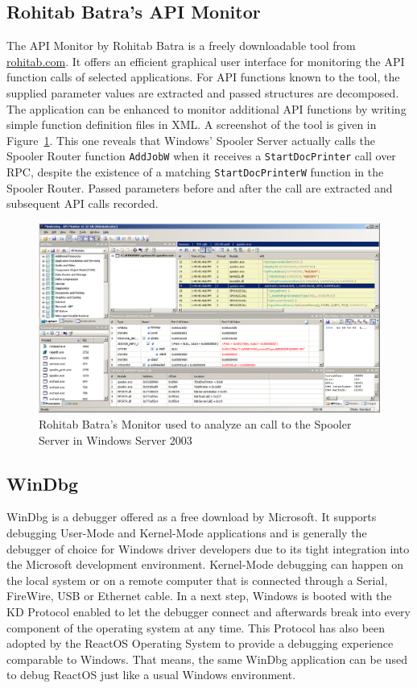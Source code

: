 \subsection{Rohitab Batra's API Monitor}
The \gls{API} Monitor by Rohitab Batra is a freely downloadable tool from \href{http://rohitab.com}{rohitab.com}.
It offers an efficient graphical user interface for monitoring the \gls{API} function calls of selected applications.
For \gls{API} functions known to the tool, the supplied parameter values are extracted and passed structures are decomposed.
The application can be enhanced to monitor additional \gls{API} functions by writing simple function definition files in \gls{XML}.
A screenshot of the tool is given in Figure~\ref{fig:APIMonitor}.
This one reveals that Windows' Spooler Server actually calls the Spooler Router function \texttt{AddJobW} when it receives a \texttt{StartDocPrinter} call over \gls{RPC}, despite the existence of a matching \texttt{StartDocPrinterW} function in the Spooler Router.
Passed parameters before and after the call are extracted and subsequent \gls{API} calls recorded.

\begin{figure}[h]
	\centering
	\includegraphics{images/apimon.png}
	\caption{Rohitab Batra's  Monitor used to analyze an  call to the Spooler Server in Windows Server 2003}
	\label{fig:APIMonitor}
\end{figure}


\subsection{WinDbg}
WinDbg is a debugger offered as a free download by Microsoft.
It supports debugging User-Mode and Kernel-Mode applications and is generally the debugger of choice for Windows driver developers due to its tight integration into the Microsoft development environment.
Kernel-Mode debugging can happen on the local system or on a remote computer that is connected through a Serial, FireWire, \gls{USB} or Ethernet cable.
In a next step, Windows is booted with the \gls{KD} Protocol enabled to let the debugger connect and afterwards break into every component of the operating system at any time.
This Protocol has also been adopted by the ReactOS Operating System to provide a debugging experience comparable to Windows.
That means, the same WinDbg application can be used to debug ReactOS just like a usual Windows environment.

